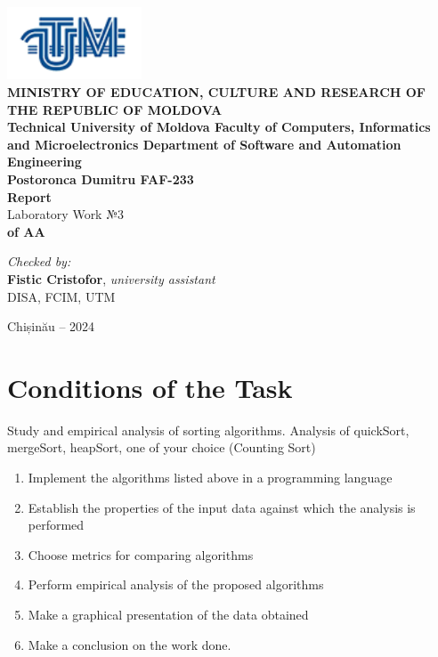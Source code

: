 \documentclass[12pt]{article}
\begin{document}
\begin{titlepage}
\begin{center}
    \includegraphics[width=0.3\textwidth]{image.png} \\[0.2cm]
    
    \textbf{MINISTRY OF EDUCATION, CULTURE AND RESEARCH 
OF THE REPUBLIC OF MOLDOVA} \\[0.3cm]
    
    \textbf{Technical University of Moldova 
Faculty of Computers, Informatics and Microelectronics 
Department of Software and Automation Engineering} \\[2cm]
    
    \textbf{Postoronca Dumitru FAF-233}\\[0.5cm]
    
    \Huge \textbf{Report} \\[0.5cm]
    
    \large Laboratory Work №3\\[0.5cm]
    
    \textbf{of AA} \\[3cm]
    
    \begin{flushright}
        \textit{Checked by:} \\
        \textbf{Fistic Cristofor}, \textit{university assistant} \\
        DISA, FCIM, UTM
    \end{flushright}
    
    \vfill
    
    Chișinău -- 2024
\end{center}
\end{titlepage}


\newpage
\setcounter{page}{1}
\pagestyle{fancy}
\fancyhf{}
\rhead{\thepage}

\section*{Conditions of the Task}
Study and empirical analysis of sorting algorithms. Analysis of quickSort, mergeSort, heapSort, one of your choice (Counting Sort)
\begin{enumerate}
    \item Implement the algorithms listed above in a programming language
    \item Establish the properties of the input data against which the analysis is performed
    \item Choose metrics for comparing algorithms
    \item Perform empirical analysis of the proposed algorithms
    \item Make a graphical presentation of the data obtained
    \item Make a conclusion on the work done.
\end{enumerate}
\end{document}
